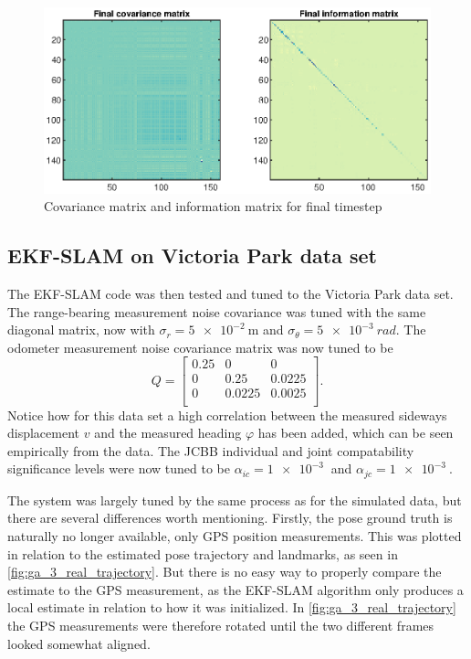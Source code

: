 \begin{figure}[!htb]
    \centering
    \includegraphics[width=0.7\linewidth]{figures/ga_3/sim_P.eps}
    \caption{Covariance matrix and information matrix for final timestep}
    \label{fig:ga_3_sim_P}
\end{figure}


\subsection{EKF-SLAM on Victoria Park data set}

The EKF-SLAM code was then tested and tuned to the Victoria Park data set. The range-bearing measurement noise covariance was tuned with the same diagonal matrix, now with $\sigma_r = \SI{5e-2}{\meter}$ and $\sigma_\theta = \SI{5e-3}{rad}$. The odometer measurement noise covariance matrix was now tuned to be
\begin{equation}
    Q = \begin{bmatrix}
        0.25 & 0 & 0 \\
        0 & 0.25 & 0.0225 \\
        0 & 0.0225 & 0.0025 \\
    \end{bmatrix}.
\end{equation}
Notice how for this data set a high correlation between the measured sideways displacement $v$ and the measured heading $\varphi$ has been added, which can be seen empirically from the data. The JCBB individual and joint compatability significance levels were now tuned to be $\alpha_{ic} = \SI{1e-3}{}$ and $\alpha_{jc} = \SI{1e-3}{}$.

The system was largely tuned by the same process as for the simulated data, but there are several differences worth mentioning. Firstly, the pose ground truth is naturally no longer available, only GPS position measurements. This was plotted in relation to the estimated pose trajectory and landmarks, as seen in \cref{fig:ga_3_real_trajectory}. But there is no easy way to properly compare the estimate to the GPS measurement, as the EKF-SLAM algorithm only produces a local estimate in relation to how it was initialized. In \cref{fig:ga_3_real_trajectory} the GPS measurements were therefore rotated until the two different frames looked somewhat aligned.

